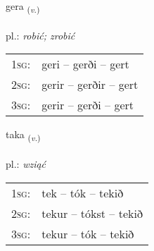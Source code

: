 \documentclass[frontgrid, backgrid]{flacards}\usepackage[]{graphicx}\usepackage[]{xcolor}
\begin{document}
{gera \small{\textsubscript{(\textit{v.})}} \\[1ex] %
\textphonetic{[cɛːra]} \\
pl.: \emph{robić; zrobić} \\  [2ex]
\renewcommand*{\arraystretch}{0.8}
\begin{tabular}{p{1cm}l}
\textsc{1sg}: & geri -- gerði -- gert \\ 
\textsc{2sg}: & gerir -- gerðir -- gert \\ 
\textsc{3sg}: & gerir -- gerði -- gert \\ 
\end{tabular}
}

\renewcommand{\flhead}{\vskip5pt \fboxsep=0pt {\small\bfseries\footnotesize Sagnorð | Verb}}
\renewcommand{\fcfoot}{\vskip5pt \fboxsep=0pt \hspace{2pt}{\small\bfseries\footnotesize 1K}}

\renewcommand{\blhead}{\vskip5pt {\small\bfseries\footnotesize Sagnorð | Verb }}
\renewcommand{\bcfoot}{\vskip5pt \hspace{2pt}{\small\bfseries\footnotesize 1K}}


{taka \small{\textsubscript{(\textit{v.})}} \\[1ex] %
\textphonetic{[tʰaːka]} \\
pl.: \emph{wziąć} \\  [2ex]
\renewcommand*{\arraystretch}{0.8}
\begin{tabular}{p{1cm}l}
\textsc{1sg}: & tek -- tók -- tekið \\ 
\textsc{2sg}: & tekur -- tókst -- tekið \\ 
\textsc{3sg}: & tekur -- tók -- tekið \\ 
\end{tabular}
}


\renewcommand{\flhead}{\vskip5pt \fboxsep=0pt {\small\bfseries\footnotesize Samtenging | Conjuction}}
\renewcommand{\fcfoot}{\vskip5pt \fboxsep=0pt \hspace{2pt}{\small\bfseries\footnotesize 1K}}
\end{document}
